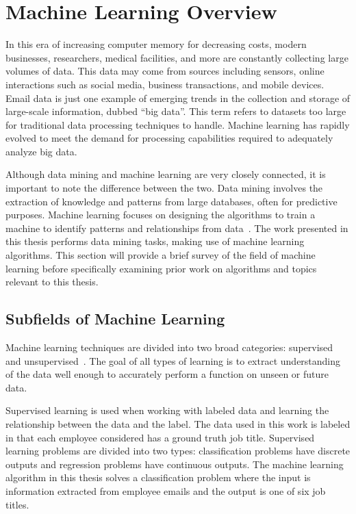 \documentclass[12pt]{report}
\begin{document}
\section{Machine Learning Overview} \label{sec:MachineLearning}
In this era of increasing computer memory for decreasing costs, modern businesses, researchers, medical facilities, and more are constantly collecting large volumes of data.
This data may come from sources including sensors, online interactions such as social media, business transactions, and mobile devices.
Email data is just one example of emerging trends in the collection and storage of large-scale information, dubbed ``big data''.
This term refers to datasets too large for traditional data processing techniques to handle.
Machine learning has rapidly evolved to meet the demand for processing capabilities required to adequately analyze big data.

Although data mining and machine learning are very closely connected, it is important to note the difference between the two.
Data mining involves the extraction of knowledge and patterns from large databases, often for predictive purposes.
Machine learning focuses on designing the algorithms to train a machine to identify patterns and relationships from data~\cite{furnkranz2012foundations}.
The work presented in this thesis performs data mining tasks, making use of machine learning algorithms.
This section will provide a brief survey of the field of machine learning before specifically examining prior work on algorithms and topics relevant to this thesis.

\subsection{Subfields of Machine Learning}
Machine learning techniques are divided into two broad categories: supervised and unsupervised~\cite{barber2012bayesian}.
The goal of all types of learning is to extract understanding of the data well enough to accurately perform a function on unseen or future data.  

Supervised learning is used when working with labeled data and learning the relationship between the data and the label.
The data used in this work is labeled in that each employee considered has a ground truth job title.
Supervised learning problems are divided into two types: classification problems have discrete outputs and regression problems have continuous outputs.
The machine learning algorithm in this thesis solves a classification problem where the input is information extracted from employee emails and the output is one of six job titles.
\end{document}
